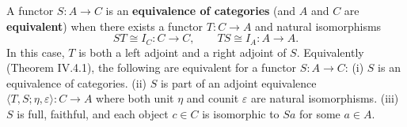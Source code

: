 A functor $S: A \to C$ is an \textbf{equivalence of categories} (and $A$ and $C$ are \textbf{equivalent}) when there exists a functor $T: C \to A$ and natural isomorphisms
$$ST \cong I_C: C \to C, \qquad TS \cong I_A: A \to A.$$
In this case, $T$ is both a left adjoint and a right adjoint of $S$. Equivalently (Theorem IV.4.1), the following are equivalent for a functor $S: A \to C$:
(i) $S$ is an equivalence of categories.
(ii) $S$ is part of an adjoint equivalence $\langle T, S; \eta, \varepsilon \rangle: C \to A$ where both unit $\eta$ and counit $\varepsilon$ are natural isomorphisms.
(iii) $S$ is full, faithful, and each object $c \in C$ is isomorphic to $Sa$ for some $a \in A$.